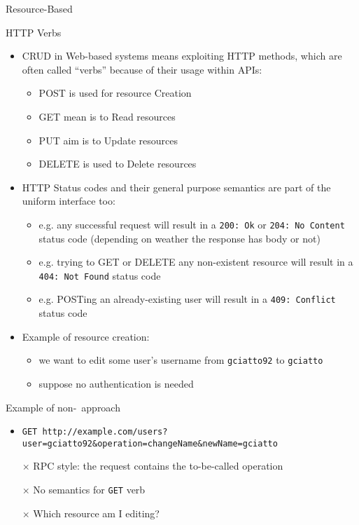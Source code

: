 \begin{frame}[allowframebreaks]
\begin{block}{Resource-Based}
\begin{itemize}
		\end{itemize}
	\end{block}
		
	\begin{block}{HTTP Verbs}
	
		\begin{itemize}
			\item CRUD in Web-based systems means exploiting HTTP methods, which are often called ``verbs'' because of their usage within APIs:
			\begin{itemize}
				\item POST is used for resource Creation
				\item GET mean is to Read resources
				\item PUT aim is to Update resources
				\item DELETE is used to Delete resources					
			\end{itemize}
			\item HTTP Status codes and their general purpose semantics are part of the uniform interface too:
			\begin{itemize}
				\item e.g. any successful request will result in a \texttt{200:\,Ok} or \texttt{204:\,No\,Content} status code (depending on weather the response has body or not)
				\item e.g. trying to GET or DELETE any non-existent resource will result in a \texttt{404:\,Not\,Found} status code
				\item e.g. POSTing an already-existing user will result in a \texttt{409:\,Conflict} status code
			\end{itemize}
		\end{itemize}
	\end{block}
	
	\framebreak
	
	\begin{itemize}
		\item Example of resource creation: 
		\begin{itemize}
			\item we want to edit some user's username from \texttt{gciatto92} to \texttt{gciatto}
			\item suppose no authentication is needed
		\end{itemize}
	\end{itemize}
	
	\begin{alertblock}{Example of non-\restful\ approach}
		\begin{itemize}
			\item \texttt{GET http://example.com/users?\-user=gciatto92\&\-operation=changeName\&\-newName=gciatto}
			\item[]
			\item[$\times$] RPC style: the request contains the to-be-called operation
			\item[$\times$] No semantics for \texttt{GET} verb
			\item[$\times$] Which resource am I editing?
		\end{itemize}
	\end{alertblock}	
	

\end{frame}
